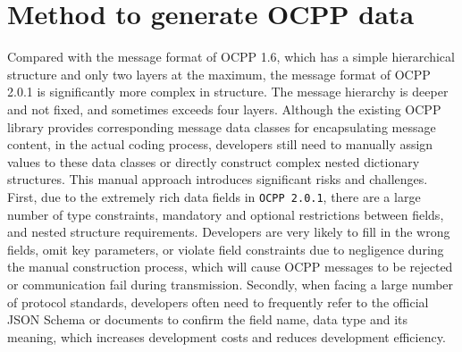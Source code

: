 \documentclass[
	english,
	ruledheaders=section,%
	class=report,%
	thesis={type=Report},%
	accentcolor=9c,%
	custommargins=true,%
	marginpar=false,%
	parskip=half-,%
	fontsize=11pt,%
	logofile={img/tuda_logo.pdf}, %
]{tudapub}
\begin{document}
\section{Method to generate OCPP data}
\label{sec:ocppGenerator}

Compared with the message format of \ac{OCPP} 1.6, which has a simple hierarchical structure and only two layers at the maximum, the message format of \ac{OCPP} 2.0.1 is significantly more complex in structure. The message hierarchy is deeper and not fixed, and sometimes exceeds four layers. Although the existing \ac{OCPP} library provides corresponding message data classes for encapsulating message content, in the actual coding process, developers still need to manually assign values to these data classes or directly construct complex nested dictionary structures. This manual approach introduces significant risks and challenges. First, due to the extremely rich data fields in \texttt{OCPP 2.0.1}, there are a large number of type constraints, mandatory and optional restrictions between fields, and nested structure requirements. Developers are very likely to fill in the wrong fields, omit key parameters, or violate field constraints due to negligence during the manual construction process, which will cause \ac{OCPP} messages to be rejected or communication fail during transmission. Secondly, when facing a large number of protocol standards, developers often need to frequently refer to the official JSON Schema or documents to confirm the field name, data type and its meaning, which increases development costs and reduces development efficiency. 
\end{document}
